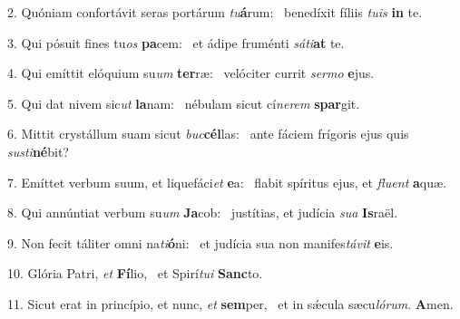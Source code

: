 2. Quóniam confortávit seras portárum \textit{tu}\textbf{á}rum: \ast\  benedíxit fíliis \textit{tu}\textit{is} \textbf{in} te.\

3. Qui pósuit fines tu\textit{os} \textbf{pa}cem: \ast\  et ádipe fruménti \textit{sá}\textit{ti}\textbf{at} te.\

4. Qui emíttit elóquium su\textit{um} \textbf{ter}ræ: \ast\  velóciter currit \textit{ser}\textit{mo} \textbf{e}jus.\

5. Qui dat nivem sic\textit{ut} \textbf{la}nam: \ast\  nébulam sicut cí\textit{ne}\textit{rem} \textbf{spar}git.\

6. Mittit crystállum suam sicut \textit{buc}\textbf{cél}las: \ast\  ante fáciem frígoris ejus quis \textit{sus}\textit{ti}\textbf{né}bit?\

7. Emíttet verbum suum, et liquefáci\textit{et} \textbf{e}a: \ast\  flabit spíritus ejus, et \textit{flu}\textit{ent} \textbf{a}quæ.\

8. Qui annúntiat verbum su\textit{um} \textbf{Ja}cob: \ast\  justítias, et judícia \textit{su}\textit{a} \textbf{Is}raël.\

9. Non fecit táliter omni na\textit{ti}\textbf{ó}ni: \ast\  et judícia sua non manifes\textit{tá}\textit{vit} \textbf{e}is.\

10. Glória Patri, \textit{et} \textbf{Fí}lio, \ast\  et Spirí\textit{tu}\textit{i} \textbf{Sanc}to.\

11. Sicut erat in princípio, et nunc, \textit{et} \textbf{sem}per, \ast\  et in sǽcula sæcu\textit{ló}\textit{rum}. \textbf{A}men.\

